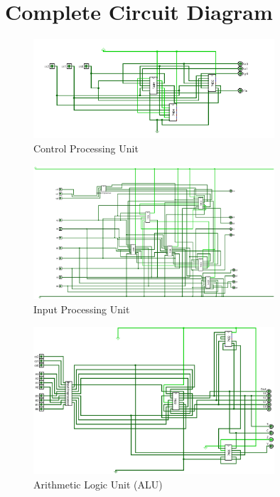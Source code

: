 \documentclass{article}
\begin{document}
\section{\large{Complete Circuit Diagram}}

     \begin{figure}[H]
         \centering
         \includegraphics[width=0.8\textwidth]{images/control_preprocessor.png}
         \caption{Control Processing Unit}
         \label{fig:alu_a}
     \end{figure}
     \begin{figure}[H]
         \centering
         \includegraphics[width=0.8\textwidth]{images/input_preprocessor.png}
         \caption{Input Processing Unit}
         \label{fig:alu_b}
     \end{figure}
     \begin{figure}[H]
         \centering
         \includegraphics[width=0.8\textwidth]{images/main.png}
         \caption{Arithmetic Logic Unit (ALU)}
         \label{fig:alu_c}
     \end{figure}
\end{document}
